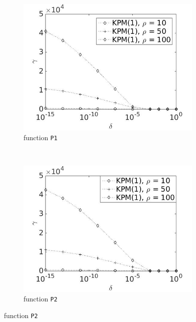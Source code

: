 \begin{figure}[H]
        \centering
        \begin{subfigure}[b]{0.45\textwidth}
                \includegraphics[width=\textwidth]{fig/s13antvstol1m}
                \caption{function \texttt{P1}}
                \label{fig:errant1}
        \end{subfigure}
~
        \begin{subfigure}[b]{0.45\textwidth}
                \includegraphics[width=\textwidth]{fig/s14antvstol2m}
                \caption{ function \texttt{P2}}
                \label{fig:errant2}
        \end{subfigure}
        

\end{figure}
